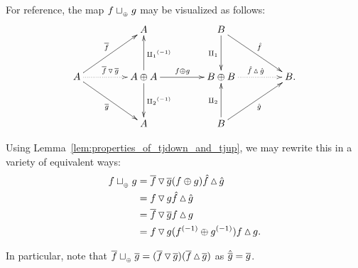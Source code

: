 For reference, the map $f \sqcup_{{_{\oplus}}} g$ may be visualized as follows:
\[
  \xymatrix@C+20pt @R+10pt{
    &A
      & B  \ar[dr]^{\rg{f}} \ar[d]_{\cpa}\\
    A \ar[ur]^{\rst{f}} \ar@{.>}[r]^{\rst{f}\tjdown \rst{g}} \ar[dr]_{\rst{g}}
      & A\+A \ar[u]_{\icpa} \ar[d]^{\icpb}
        \ar[r]^{f\+g}
       &B\+B \ar@{.>}[r]^{\rg{f}\tjup\rg{g}} & B.\\
    & A & B\ar[ur]_{\rg{g}} \ar[u]^{\cpb}
  }
\]

Using Lemma~\ref{lem:properties_of_tjdown_and_tjup}, we may rewrite this in a variety of
equivalent ways:
\begin{align*}
  f \sqcup_{{_{\oplus}}} g &= \overline{f}\operatorname{\triangledown}\overline{g} (f\oplus g) \hat{f}\operatorname{\vartriangle}\hat{g} \\
  &= f \operatorname{\triangledown} g \hat{f}\operatorname{\vartriangle}\hat{g}\\
  & = \overline{f}\operatorname{\triangledown}\overline{g}  f\operatorname{\vartriangle} g\\
  & = f \operatorname{\triangledown} g ({f}^{(-1)}\oplus{g}^{(-1)})f\operatorname{\vartriangle} g.
\end{align*}

In particular, note that $\overline{f}\sqcup_{{_{\oplus}}} \overline{g} = (\overline{f} \operatorname{\triangledown} \overline{g})
(\overline{f}\operatorname{\vartriangle}\overline{g})$ as $\hat{\overline{g}} = \overline{g}$.

